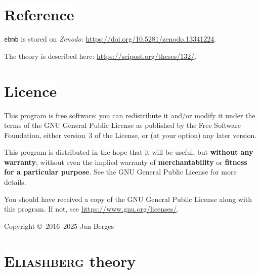 \documentclass[a4paper]{article}
\def\headline#1{\section*{%
   \normalsize\normalfont%
   \rlap{\rule[0.5ex]\textwidth{0.4pt}}%
   \qquad\colorbox{white}{#1}%
   }}
\begin{document}
   \headline{Reference}

   \texttt{ebmb} is stored on \textit{Zenodo:}
   \url{https://doi.org/10.5281/zenodo.13341224}.

   The theory is described here:
   \url{https://scipost.org/theses/132/}.

   \headline{Licence}

   This program is free software: you can redistribute it and/or modify it under
   the terms of the GNU General Public License as published by the Free Software
   Foundation, either version~3 of the License, or (at your option) any later
   version.

   This program is distributed in the hope that it will be useful, but
   \textbf{without any warranty}; without even the implied warranty of
   \textbf{merchantability} or \textbf{fitness for a particular purpose}.
   See the GNU General Public License for more details.

   You should have received a copy of the GNU General Public License along with
   this program. If not, see \url{https://www.gnu.org/licenses/}.

   \bigskip

   Copyright \copyright~2016--2025 Jan Berges

   \headline{\textsc{Eliashberg} theory}
\end{document}
